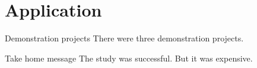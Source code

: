 \section{Application}

\begin{frame}{Demonstration projects}
There were three demonstration projects.  

\end{frame}

\begin{frame}{Take home message}
The study was successful. But it was expensive.

\end{frame}
